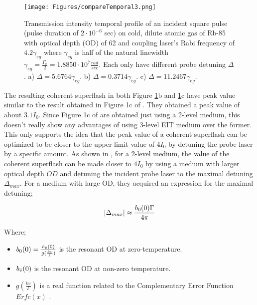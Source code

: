 \begin{figure}[h!]
    \centering
    \texttt{[image: Figures/compareTemporal3.png]}
    \caption{Transmission intensity temporal profile of an incident square pulse (pulse duration of $2\cdot10^{-6}$ sec) on cold, dilute atomic gas of Rb-85 with optical depth (OD) of 62 and coupling laser's Rabi frequency of $4.2\gamma_{eg}$ where $\gamma_{eg}$ is half of the natural linewidth $\gamma_{eg} = \frac{\Gamma_{e}}{2} = 1.8850 \cdot 10^{7} \frac{rad}{sec}$. Each only have different probe detuning $\Delta$. a) $\Delta = 5.6764\gamma_{eg}$. b) $\Delta = 0.3714\gamma_{eg}$. c) $\Delta = 11.2467\gamma_{eg}$.}
    \label{fig: comparing temporal profile 2}
\end{figure}

The resulting coherent superflash in both Figure \ref{fig: comparing temporal profile 2}b and \ref{fig: comparing temporal profile 2}c have peak value similar to the result obtained in Figure 1c of \cite{Kwong2014}. They obtained a peak value of about $3.1 I_{0}$. Since Figure 1c of \cite{Kwong2014} are obtained just using a 2-level medium, this doesn't really show any advantages of using 3-level EIT medium over the former. This only supports the idea that the peak value of a coherent superflash can be optimized to be closer to the upper limit value of $4I_{0}$ by detuning the probe laser by a specific amount. As shown in \cite{Kwong2014}, for a 2-level medium, the value of the coherent superflash can be made closer to $4I_{0}$ by using a medium with larger optical depth $OD$ and detuning the incident probe laser to the maximal detuning $\Delta_{max}$. For a medium with large OD, they acquired an expression for the maximal detuning;

\begin{equation}
    \abs{\Delta_{max}} \approx \frac{b_{0}(0) \Gamma}{4\pi} 
\end{equation}

Where;

\begin{itemize}
    \item $b_{0}(0) = \frac{b_{\Bar{v}}(0)}{g(\frac{kv}{\Gamma})}$ is the resonant OD at zero-temperature. 
    \item $b_{\Bar{v}}(0)$ is the resonant OD at non-zero temperature.
    \item $g(\frac{kv}{\Gamma})$ is a real function related to the Complementary Error Function $Erfc(x)$ \cite{abramowitz1965ia}.
\end{itemize}

